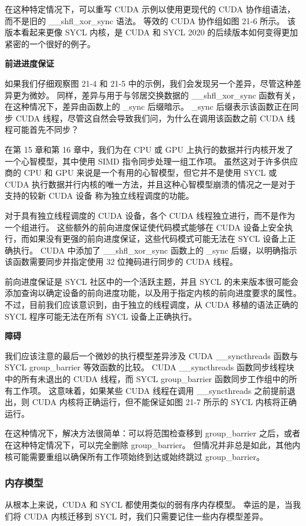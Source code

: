 在这种特定情况下，可以重写 CUDA 示例以使用更现代的 CUDA 协作组语法，而不是旧的 \_\_shfl\_xor\_sync 语法。 等效的 CUDA 协作组如图 21-6 所示。 该版本看起来更像 SYCL 内核，是 CUDA 和 SYCL 2020 的后续版本如何变得更加紧密的一个很好的例子。

\textbf{前进进度保证}

如果我们仔细观察图 21-4 和 21-5 中的示例，我们会发现另一个差异，尽管这种差异更为微妙。 同样，差异与用于与邻居交换数据的 \_\_shfl\_xor\_sync 函数有关，在这种情况下，差异由函数上的 \_sync 后缀暗示。 \_sync 后缀表示该函数正在同步 CUDA 线程，尽管这自然会导致我们问，为什么在调用该函数之前 CUDA 线程可能首先不同步？

在第 15 章和第 16 章中，我们为在 CPU 或 GPU 上执行的数据并行内核开发了一个心智模型，其中使用 SIMD 指令同步处理一组工作项。 虽然这对于许多供应商的 CPU 和 GPU 来说是一个有用的心智模型，但它并不是使用 SYCL 或 CUDA 执行数据并行内核的唯一方法，并且这种心智模型崩溃的情况之一是对于支持的较新 CUDA 设备 称为独立线程调度的功能。

对于具有独立线程调度的 CUDA 设备，各个 CUDA 线程独立进行，而不是作为一个组进行。 这些额外的前向进度保证使代码模式能够在 CUDA 设备上安全执行，而如果没有更强的前向进度保证，这些代码模式可能无法在 SYCL 设备上正确执行。 CUDA 中添加了 \_\_shfl\_xor\_sync 函数上的 \_sync 后缀，以明确指示该函数需要同步并指定使用 32 位掩码进行同步的 CUDA 线程。

前向进度保证是 SYCL 社区中的一个活跃主题，并且 SYCL 的未来版本很可能会添加查询以确定设备的前向进度功能，以及用于指定内核的前向进度要求的属性。 不过，目前我们应该意识到，由于独立的线程调度，从 CUDA 移植的语法正确的 SYCL 程序可能无法在所有 SYCL 设备上正确执行。

\textbf{障碍}

我们应该注意的最后一个微妙的执行模型差异涉及 CUDA \_\_syncthreads 函数与 SYCL group\_barrier 等效函数的比较。 CUDA \_\_syncthreads 函数同步线程块中的所有未退出的 CUDA 线程，而 SYCL group\_barrier 函数同步工作组中的所有工作项。 这意味着，如果某些 CUDA 线程在调用 \_\_syncthreads 之前提前退出，则 CUDA 内核将正确运行，但不能保证如图 21-7 所示的 SYCL 内核将正确运行。

在这种情况下，解决方法很简单：可以将范围检查移到 group\_barrier 之后，或者在这种特定情况下，可以完全删除 group\_barrier。 但情况并非总是如此，其他内核可能需要重组以确保所有工作项始终到达或始终跳过 group\_barrier。

\subsubsection{内存模型}
从根本上来说，CUDA 和 SYCL 都使用类似的弱有序内存模型。 幸运的是，当我们将 CUDA 内核迁移到 SYCL 时，我们只需要记住一些内存模型差异。

